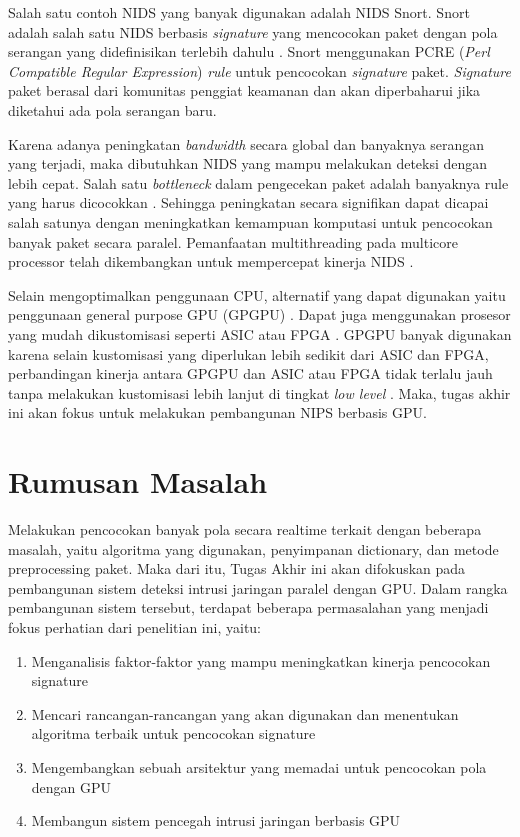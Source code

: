   Salah satu contoh NIDS yang banyak digunakan adalah NIDS Snort. Snort adalah salah satu NIDS berbasis \emph{signature} yang mencocokan paket dengan pola serangan yang didefinisikan terlebih dahulu \parencite{snort}. Snort menggunakan PCRE (\emph{Perl Compatible Regular Expression}) \emph{rule} untuk pencocokan \emph{signature} paket. \emph{Signature} paket berasal dari komunitas penggiat keamanan dan akan diperbaharui jika diketahui ada pola serangan baru.

  Karena adanya peningkatan \emph{bandwidth} secara global dan banyaknya serangan yang terjadi, maka dibutuhkan NIDS yang mampu melakukan deteksi dengan lebih cepat. Salah satu \emph{bottleneck} dalam pengecekan paket adalah banyaknya rule yang harus dicocokkan \parencite{pcre2007}. Sehingga peningkatan secara signifikan dapat dicapai salah satunya dengan meningkatkan kemampuan komputasi untuk pencocokan banyak paket secara paralel. Pemanfaatan multithreading pada multicore processor telah dikembangkan untuk mempercepat kinerja NIDS \parencite{multi2004}.

  Selain mengoptimalkan penggunaan CPU, alternatif yang dapat digunakan yaitu penggunaan general purpose GPU (GPGPU) \parencite{4482891}. Dapat juga menggunakan prosesor yang mudah dikustomisasi seperti ASIC atau FPGA \parencite{fpga2008}. GPGPU banyak digunakan karena selain kustomisasi yang diperlukan lebih sedikit dari ASIC dan FPGA, perbandingan kinerja antara GPGPU dan ASIC atau FPGA tidak terlalu jauh tanpa melakukan kustomisasi lebih lanjut di tingkat \emph{low level} \parencite{gnort2008}. Maka, tugas akhir ini akan fokus untuk melakukan pembangunan NIPS berbasis GPU.

\section{Rumusan Masalah}

  Melakukan pencocokan banyak pola secara realtime terkait dengan beberapa masalah, yaitu algoritma yang digunakan, penyimpanan dictionary, dan metode preprocessing paket. Maka dari itu, Tugas Akhir ini akan difokuskan pada pembangunan sistem deteksi intrusi jaringan paralel dengan GPU. Dalam rangka pembangunan sistem tersebut, terdapat beberapa permasalahan yang menjadi fokus perhatian dari penelitian ini, yaitu:

  \begin{enumerate}
      \item Menganalisis faktor-faktor yang mampu meningkatkan kinerja pencocokan signature
      \item Mencari rancangan-rancangan yang akan digunakan dan menentukan algoritma terbaik untuk pencocokan signature
      \item Mengembangkan sebuah arsitektur yang memadai untuk pencocokan pola dengan GPU
      \item Membangun sistem pencegah intrusi jaringan berbasis GPU
  \end{enumerate}

